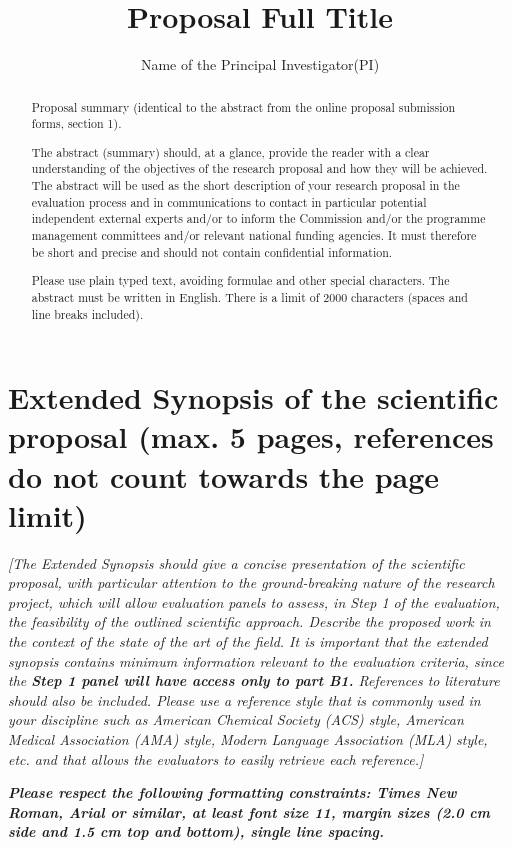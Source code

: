 \documentclass{article}
\title{Proposal Full Title}
\author[Applicant's last name]{Name of the Principal Investigator(PI)}
\begin{document}
\maketitle

\begin{abstract}
	Proposal summary (identical to the abstract from the online proposal submission forms, section 1). 

	The abstract (summary) should, at a glance, provide the reader with a clear understanding of the objectives of the research proposal and how they will be achieved. The abstract will be used as the short description of your research proposal in the evaluation process and in communications to contact in particular potential independent external experts and/or to inform the Commission and/or the programme management committees and/or relevant national funding agencies. It must therefore be short and precise and should not contain confidential information. 

	Please use plain typed text, avoiding formulae and other special characters. The abstract must be written in English. There is a limit of 2000 characters (spaces and line breaks included).
\end{abstract}

\section{Extended Synopsis of the scientific proposal (max. 5 pages, references do not count towards the page limit)}

\textit{[The Extended Synopsis should give a concise presentation of the scientific proposal, with particular attention to the ground-breaking nature of the research project, which will allow evaluation panels to assess, in Step 1 of the evaluation, the feasibility of the outlined scientific approach. Describe the proposed work in the context of the state of the art of the field. It is important that the extended synopsis contains minimum information relevant to the evaluation criteria, since the \textbf{Step 1 panel will have access only to part B1.}
References to literature should also be included. Please use a reference style that is commonly used in your discipline such as American Chemical Society (ACS) style, American Medical Association (AMA) style, Modern Language Association (MLA) style, etc. and that allows the evaluators to easily retrieve each reference.]}

\textit{\textbf{Please respect the following formatting constraints: Times New Roman, Arial or similar, at least font size 11, margin sizes (2.0 cm side and 1.5 cm top and bottom), single line spacing.}}
\end{document}
